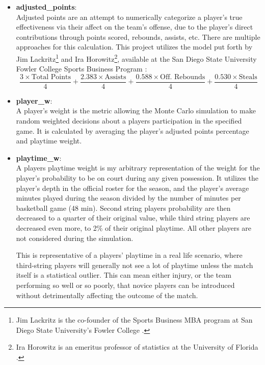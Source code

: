 \documentclass{thesis-ekf}
\theoremstyle{definition}
\theoremstyle{remark}
\begin{document}
\begin{itemize}
	\item \textbf{adjusted\_points}: \\
	Adjusted points are an attempt to numerically categorize a player's true effectiveness via their affect on the team's offense, due to the player's direct contributions through points scored, rebounds, assists, etc. There are multiple approaches for this calculation. This project utilizes the model put forth by Jim Lackritz\footnote{Jim Lackritz is the co-founder of the Sports Business MBA program at San Diego State University's Fowler College \cite{SDSU}.} and Ira Horowitz\footnote{Ira Horowitz is an emeritus professor of statistics at the University of Florida \cite{SDSU}.}, available at the San Diego State University Fowler College Sports Business Program \cite{SDSU}:
	\begin{equation}
		\label{eq-adj-pts}
		\tag{Model 5.1: Lackritz's Adjusted Points Equation}
		\frac{3 \times \text{Total Points}}{4} + \frac{2.383 \times \text{Assists}}{4} + \frac{0.588 \times \text{Off. Rebounds}}{4} + \frac{0.530 \times \text{Steals}}{4}
	\end{equation}
		
	\item \textbf{player\_w}: \\
	A player's weight is the metric allowing the Monte Carlo simulation to make random weighted decisions about a players participation in the specified game. It is calculated by averaging the player's adjusted points percentage and playtime weight.
	
	\item \textbf{playtime\_w}:\\
	A players playtime weight is my arbitrary representation of the weight for the player's probability to be on court during any given possession. It utilizes the player's depth in the official roster for the season, and the player's average minutes played during the season divided by the number of minutes per basketball game (48 min). Second string players probability are then decreased to a quarter of their original value, while third string players are decreased even more, to 2\% of their original playtime. All other players are not considered during the simulation. 
	
	This is representative of a players' playtime in a real life scenario, where third-string players will generally not see a lot of playtime unless the match itself is a statistical outlier. This can mean either injury, or the team performing so well or so poorly, that novice players can be introduced without detrimentally affecting the outcome of the match.
	

\end{itemize}
\end{document}
